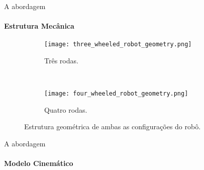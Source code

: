 \begin{frame}[c]{A abordagem}
  \framesubtitle{Estrutura Mecânica}
  \transdissolve[duration=0.5]

  \begin{figure}[ht!]
    \centering
    \begin{subfigure}[b]{0.38\textwidth}
      \texttt{[image: three\_wheeled\_robot\_geometry.png]}
      \caption{Três rodas.}
      \label{fig:3_wheels_robot_geometry}
    \end{subfigure}
    ~
    \begin{subfigure}[b]{0.38\textwidth}
      \texttt{[image: four\_wheeled\_robot\_geometry.png]}
      \caption{Quatro rodas.}
      \label{fig:4_wheels_robot_geometry}
    \end{subfigure}
    
    \caption{Estrutura geométrica de ambas as configurações do robô. \cite{Oliveira2008}}
  \end{figure}


\end{frame}

\begin{frame}[c]{A abordagem}
  \framesubtitle{Modelo Cinemático}
  \transdissolve[duration=0.5]

    


\end{frame}


